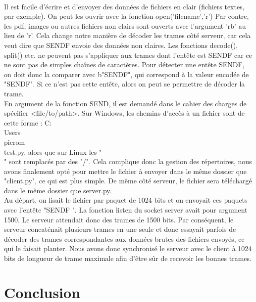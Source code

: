 \documentclass[12pt]{article}
\begin{document}
{
\\
Il est facile d'écrire et d'envoyer des données de fichiers en clair (fichiers textes, par exemple). On peut les ouvrir avec la fonction open('filename','r')
Par contre, les pdf, images ou autres fichiers non clairs sont ouverts avec l'argument 'rb' au lieu de 'r'.
Cela change notre manière de décoder les trames côté serveur, car cela veut dire que SENDF envoie des données non claires.
Les fonctions decode(), split() etc. ne peuvent pas s'appliquer aux trames dont l'entête est SENDF car ce ne sont pas de simples chaînes de caractères.
Pour détecter une entête SENDF, on doit donc la comparer avec b"SENDF", qui correspond à la valeur encodée de "SENDF". Si ce n'est pas cette entête, alors on peut se permettre de décoder la trame.
\\
En argument de la fonction SEND, il est demandé dans le cahier des charges de spécifier <file/to/path>.
Sur Windows, les chemins d'accès à un fichier sont de cette forme : C:\\Users\\picrom\\test.py, alors que sur Linux les "\\" sont remplacés par des "/".
Cela complique donc la gestion des répertoires, nous avons finalement opté pour mettre le fichier à envoyer dans le même dossier que "client.py", ce qui est plus simple.
De même côté serveur, le fichier sera téléchargé dans le même dossier que server.py.
\\
Au départ, on lisait le fichier par paquet de 1024 bits et on envoyait ces paquets avec l'entête "SENDF ".
La fonction listen du socket server avait pour argument 1500. Le serveur attendait donc des trames de 1500 bits.
Par conséquent, le serveur concaténait plusieurs trames en une seule et donc essayait parfois de décoder des trames correspondantes aux données brutes des fichiers envoyés, ce qui le faisait planter.
Nous avons donc synchronisé le serveur avec le client à 1024 bits de longueur de trame maximale afin d'être sûr de recevoir les bonnes trames.


\section{Conclusion}




}
\end{document}
